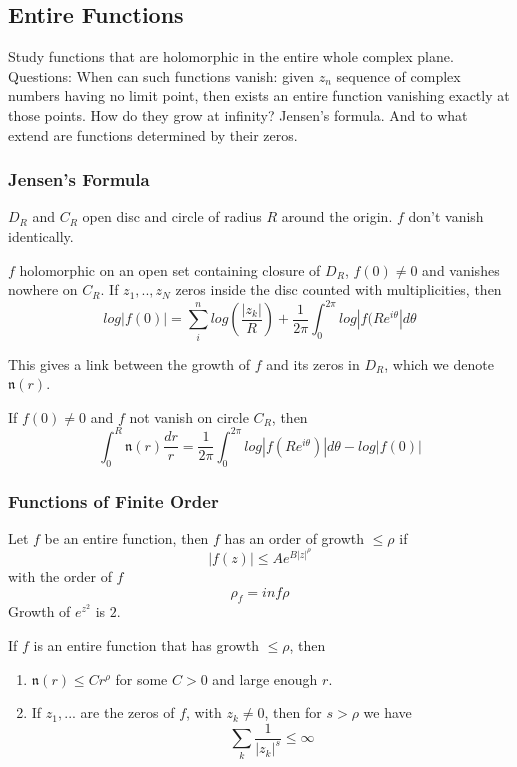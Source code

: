 \documentclass[main.tex]{subfiles}
\begin{document}
\subsection{Entire Functions}
Study functions that are holomorphic in the entire whole complex plane.
Questions: When can such functions vanish: given $z_n$ sequence of complex numbers having no limit point, then exists an entire function vanishing exactly at those points. How do they grow at infinity? Jensen's formula. And to what extend are functions determined by their zeros.

\subsubsection{Jensen's Formula}
$D_R$ and $C_R$ open disc and circle of radius $R$ around the origin. $f$ don't vanish identically.

\begin{theorem}
$f$ holomorphic on an open set containing closure of $D_R$, $f(0) \neq 0$ and vanishes nowhere on $C_R$. If $z_1, .. , z_N$ zeros inside the disc counted with multiplicities, then
$$
log |f(0)| = \sum_i ^n log(\frac{|z_k|}{R}) + \frac{1}{2\pi} \int_0 ^{2\pi} log |f (R e^{i\theta} | d\theta
$$
\end{theorem}

This gives a link between the growth of $f$ and its zeros in $D_R$, which we denote $\mathfrak{n}(r)$.

If $f(0) \neq 0$ and $f$ not vanish on circle $C_R$, then
$$
\int_0 ^R \mathfrak{n}(r) \frac{dr}{r} = \frac{1}{2\pi} \int_0 ^{2 \pi} log |f(Re^{i\theta})| d\theta - log|f(0)|
$$

\subsubsection{Functions of Finite Order}
Let $f$ be an entire function, then $f$ has an order of growth $\leq \rho$ if 
$$
|f(z)| \leq A e^{B |z|^{\rho}}
$$
with the order of $f$ 
$$
\rho_f = inf \rho
$$
Growth of $e^{z^2}$ is $2$.

\begin{theorem}
If $f$ is an entire function that has growth $\leq \rho$, then 
\begin{enumerate}
    \item $\mathfrak{n}(r) \leq C r^\rho$ for some $C > 0$ and large enough $r$.
    \item If $z_1, ...$ are the zeros of $f$, with $z_k \neq 0$, then for $s > \rho$ we have 
    $$
    \sum_k \frac{1}{|z_k|^s} \leq \infty
    $$
\end{enumerate}
\end{theorem}
\end{document}
